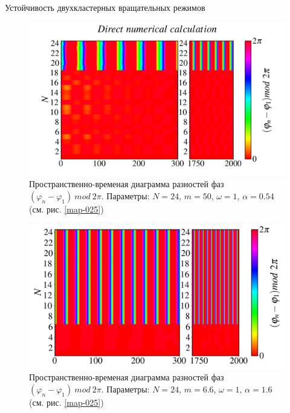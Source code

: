 \begin{chapter}{Устойчивость двухкластерных вращательных режимов}
	\begin{figure}[h!]
		\begin{center}
			\includegraphics[width=1\columnwidth]{pictures/Figure_M_50_A_0.54_O_1.png}
		\end{center}
		\caption{Пространственно-временая диаграмма разностей фаз $(\varphi_n - \varphi_1) \ mod \ 2\pi$.
		Параметры: $N=24$, $m = 50$, $\omega = 1$, $\alpha = 0.54$ (см. рис. \ref{map-025})}
		\label{st-c-3}
	\end{figure}

	\begin{figure}[h!]
		\begin{center}
			\includegraphics[width=1\columnwidth]{pictures/Figure_d.png}
		\end{center}
		\caption{Пространственно-временая диаграмма разностей фаз $(\varphi_n - \varphi_1) \ mod \ 2\pi$.
		Параметры: $N=24$, $m = 6.6$, $\omega = 1$, $\alpha = 1.6$ (см. рис. \ref{map-025})}
		\label{st-c-4}
	\end{figure}


\end{chapter}

